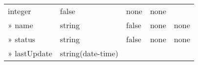 \documentclass[
]{article}
\begin{document}
\begin{longtable}[]{@{}lllll@{}}
\begin{minipage}[t]{0.17\columnwidth}
integer\strut
\end{minipage} & \begin{minipage}[t]{0.17\columnwidth}\raggedright
false\strut
\end{minipage} & \begin{minipage}[t]{0.17\columnwidth}\raggedright
none\strut
\end{minipage} & \begin{minipage}[t]{0.17\columnwidth}\raggedright
none\strut
\end{minipage}\tabularnewline
\begin{minipage}[t]{0.17\columnwidth}\raggedright
» name\strut
\end{minipage} & \begin{minipage}[t]{0.17\columnwidth}\raggedright
string\strut
\end{minipage} & \begin{minipage}[t]{0.17\columnwidth}\raggedright
false\strut
\end{minipage} & \begin{minipage}[t]{0.17\columnwidth}\raggedright
none\strut
\end{minipage} & \begin{minipage}[t]{0.17\columnwidth}\raggedright
none\strut
\end{minipage}\tabularnewline
\begin{minipage}[t]{0.17\columnwidth}\raggedright
» status\strut
\end{minipage} & \begin{minipage}[t]{0.17\columnwidth}\raggedright
string\strut
\end{minipage} & \begin{minipage}[t]{0.17\columnwidth}\raggedright
false\strut
\end{minipage} & \begin{minipage}[t]{0.17\columnwidth}\raggedright
none\strut
\end{minipage} & \begin{minipage}[t]{0.17\columnwidth}\raggedright
none\strut
\end{minipage}\tabularnewline
\begin{minipage}[t]{0.17\columnwidth}\raggedright
» lastUpdate\strut
\end{minipage} & \begin{minipage}[t]{0.17\columnwidth}\raggedright
string(date-time)\strut
\end{minipage} & \begin{minipage}[t]{0.17\columnwidth}\raggedright

\end{minipage}
\end{longtable}
\end{document}

